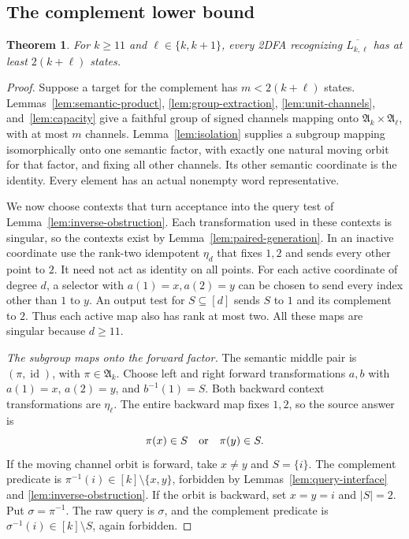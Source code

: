 \documentclass[11pt,a4paper]{article}
\newtheorem{theorem}{Theorem}[section]
\theoremstyle{definition}
\theoremstyle{remark}
\newcommand{\Alt}{\mathfrak A}
\newcommand{\id}{\operatorname{id}}
\begin{document}
\subsection{The complement lower bound}

\begin{theorem}\label{thm:complement-lower}
For $k\ge11$ and $\ell\in\{k,k+1\}$, every 2DFA recognizing
$\overline{L_{k,\ell}}$ has at least $2(k+\ell)$ states.
\end{theorem}
\begin{proof}
Suppose a target for the complement has $m<2(k+\ell)$ states. Lemmas~\ref{lem:semantic-product}, \ref{lem:group-extraction},
\ref{lem:unit-channels}, and~\ref{lem:capacity} give a faithful group of signed channels mapping onto $\Alt_k\times\Alt_\ell$, with at most $m$ channels. Lemma~\ref{lem:isolation} supplies a subgroup mapping isomorphically onto one semantic factor, with exactly one natural moving orbit for that factor, and fixing all other channels. Its other semantic coordinate is the identity. Every element has an actual nonempty word representative.

We now choose contexts that turn acceptance into the query test of
Lemma~\ref{lem:inverse-obstruction}. Each transformation used in
these contexts is singular, so the contexts exist by
Lemma~\ref{lem:paired-generation}. In an inactive coordinate use the rank-two idempotent $\eta_d$ that fixes $1,2$ and sends every other point to $2$. It need not act as identity on all points. For each active coordinate of degree $d$, a selector with
$a(1)=x,a(2)=y$ can be chosen to send every index other than $1$
to $y$. An output test for $S\subseteq[d]$ sends $S$ to $1$ and
its complement to $2$. Thus each active map also has rank at most
two. All these maps are singular because $d\ge11$.

\emph{The subgroup maps onto the forward factor.} The semantic middle pair is $(\pi,\id)$, with $\pi\in\Alt_k$. Choose left and right forward transformations $a,b$ with $a(1)=x$, $a(2)=y$, and $b^{-1}(1)=S$. Both backward context transformations are $\eta_\ell$. The entire backward map fixes $1,2$, so the source answer is
\begin{equation}\label{eq:forward-factor}
\pi(x)\in S\quad\hbox{or}\quad\pi(y)\in S.
\end{equation}
If the moving channel orbit is forward, take $x\ne y$ and $S=\{i\}$. The complement predicate is $\pi^{-1}(i)\in[k]\setminus\{x,y\}$, forbidden by Lemmas~\ref{lem:query-interface} and \ref{lem:inverse-obstruction}.
If the orbit is backward, set $x=y=i$ and $|S|=2$. Put $\sigma=\pi^{-1}$. The raw query is $\sigma$, and the complement predicate is $\sigma^{-1}(i)\in[k]\setminus S$, again forbidden.


\end{proof}
\end{document}
